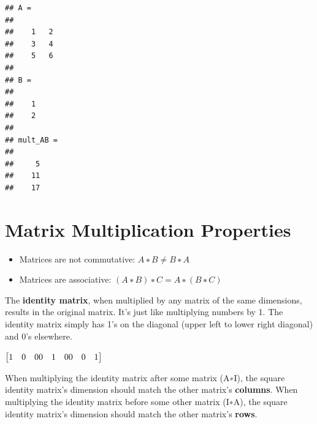\documentclass[
]{book}
\providecommand{\tightlist}{%
  \setlength{\itemsep}{0pt}\setlength{\parskip}{0pt}}
\begin{document}
\begin{verbatim}
## A =
## 
##    1   2
##    3   4
##    5   6
## 
## B =
## 
##    1
##    2
## 
## mult_AB =
## 
##     5
##    11
##    17
\end{verbatim}

\hypertarget{matrix-multiplication-properties}{%
\section{Matrix Multiplication Properties}\label{matrix-multiplication-properties}}

\begin{itemize}
\tightlist
\item
  Matrices are not commutative: \(A∗B \neq B∗A\)
\item
  Matrices are associative: \((A∗B)∗C = A∗(B∗C)\)
\end{itemize}

The \textbf{identity matrix}, when multiplied by any matrix of the same dimensions, results in the original matrix. It's just like multiplying numbers by 1. The identity matrix simply has 1's on the diagonal (upper left to lower right diagonal) and 0's elsewhere.

\(\begin{bmatrix} 1 & 0 & 0 \newline 0 & 1 & 0 \newline 0 & 0 & 1 \newline \end{bmatrix}\)

When multiplying the identity matrix after some matrix (A∗I), the square identity matrix's dimension should match the other matrix's \textbf{columns}. When multiplying the identity matrix before some other matrix (I∗A), the square identity matrix's dimension should match the other matrix's \textbf{rows}.
\end{document}
